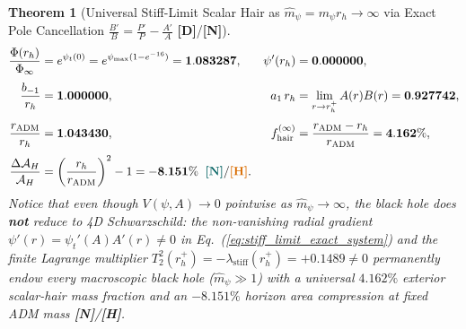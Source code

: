 \documentclass[11pt,a4paper]{article}
\newcommand{\catD}{\textbf{\textcolor{blue!75!black}{[D]}}}
\newcommand{\catH}{\textbf{\textcolor{orange!85!black}{[H]}}}
\newcommand{\catN}{\textbf{\textcolor{teal!75!black}{[N]}}}
\newtheorem{theorem}{Theorem}[section]
\theoremstyle{definition}
\theoremstyle{remark}
\begin{document}
\begin{theorem}[Universal Stiff-Limit Scalar Hair as $\hat{m}_{\psi} = m_{\psi}r_h \to \infty$ via Exact Pole Cancellation $\frac{B'}{B} = \frac{P'}{P} - \frac{A'}{A}$ \catD/\catN]
\begin{align}
  \frac{\Phi(r_h)}{\Phi_{\infty}} &= e^{\psi_t(0)} = e^{\psi_{\max}(1 - e^{-16})} = \mathbf{1.083287}, &
  \psi'(r_h) &= \mathbf{0.000000}, \nonumber \\[3pt]
  \frac{b_{-1}}{r_h} &= \mathbf{1.000000}, &
  a_1\,r_h &= \lim_{r \to r_h^+} A(r)B(r) = \mathbf{0.927742}, \nonumber \\[3pt]
  \frac{r_{\text{ADM}}}{r_h} &= \mathbf{1.043430}, &
  f_{\text{hair}}^{(\infty)} &= \frac{r_{\text{ADM}} - r_h}{r_{\text{ADM}}} = \mathbf{4.162\%}, \nonumber \\[3pt]
  \frac{\Delta\mathcal{A}_H}{\mathcal{A}_H} &= \left(\frac{r_h}{r_{\text{ADM}}}\right)^2 - 1 = \mathbf{-8.151\%} \;\;\catN/\catH. & &
  \label{eq:stiff_limit_universal_numbers}
\end{align}
Notice that even though $V(\psi, A) \to 0$ pointwise as $\hat{m}_{\psi} \to \infty$, the black hole does \textbf{not} reduce to 4D Schwarzschild: the non-vanishing radial gradient $\psi'(r) = \psi_t'(A)A'(r) \neq 0$ in Eq.~(\ref{eq:stiff_limit_exact_system}) and the finite Lagrange multiplier $T^2_2(r_h^+) = -\lambda_{\text{stiff}}(r_h^+) = +0.1489 \neq 0$ permanently endow every macroscopic black hole ($\hat{m}_{\psi} \gg 1$) with a universal $\mathbf{4.162\%}$ exterior scalar-hair mass fraction and an $\mathbf{-8.151\%}$ horizon area compression at fixed ADM mass \catN/\catH.
\end{theorem}
\end{document}

